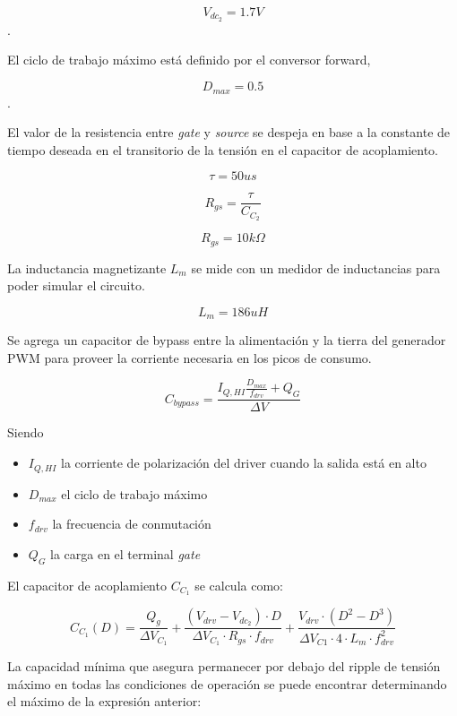 $$ V_{dc_2}=1.7V $$.

El ciclo de trabajo máximo está definido por el conversor forward, 

$$ D_{max}=0.5 $$.

El valor de la resistencia entre \textit{gate} y \textit{source} se despeja en base a la constante de tiempo deseada en el transitorio de la tensión en el capacitor de acoplamiento.

$$ \tau=50us $$


$$ R_{gs}=\frac{\tau}{C_{C_2}} $$

$$ R_{gs}=10k\Omega $$

La inductancia magnetizante $L_m$ se mide con un medidor de inductancias para poder simular el circuito.

$$ L_m=186uH $$



Se agrega un capacitor de bypass entre la alimentación y la tierra del generador PWM para proveer la corriente necesaria en los picos de consumo.


$$ C_{bypass}=\frac{I_{Q,HI}\frac{D_{max}}{f_{drv}}+Q_G}{\Delta V} $$

Siendo

\begin{itemize}
    \item $I_{Q,HI}$ la corriente de polarización del driver cuando la salida está en alto
    \item $D_{max}$ el ciclo de trabajo máximo
    \item $f_{drv}$ la frecuencia de conmutación
    \item $Q_G$ la carga en el terminal \textit{gate}
\end{itemize}

El capacitor de acoplamiento $C_{C_1}$ se calcula como:

$$ C_{C_1}(D)=\frac{Q_g}{\Delta V_{C_1}}+\frac{(V_{drv}-V_{{dc}_2})\cdot D}{\Delta V_{C_1}\cdot R_{gs}\cdot f_{drv}}+\frac{V_{drv}\cdot (D^2-D^3)}{\Delta V_{C1}\cdot 4\cdot L_m\cdot f_{drv}^2} $$

La capacidad mínima que asegura permanecer por debajo del ripple de tensión máximo en todas las condiciones de operación 
se puede encontrar determinando el máximo de la expresión anterior:

